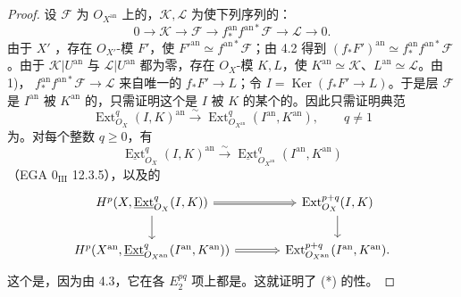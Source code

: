 \begin{proof}
设 $\mathcal F$ 为 $O_{X^{\mathrm{an}}}$ 上的，$\mathcal K,\mathcal L$ 为使下列序列的：
\[
0\longrightarrow\mathcal K\longrightarrow\mathcal F
\longrightarrow f_*^{\mathrm{an}}f^{\mathrm{an}*}\mathcal F
\longrightarrow\mathcal L\longrightarrow0.
\]
由于 $X'$ ，存在 $O_{X'}$-模 $F'$，使 $F'^{\mathrm{an}}\simeq f^{\mathrm{an}*}\mathcal F$；由 4.2 得到 $(f_*F')^{\mathrm{an}}\simeq f_*^{\mathrm{an}}f^{\mathrm{an}*}\mathcal F$。由于 $\mathcal K|U^{\mathrm{an}}$ 与 $\mathcal L|U^{\mathrm{an}}$ 都为零，存在 $O_X$-模 $K,L$，使 $K^{\mathrm{an}}\simeq\mathcal K$、$L^{\mathrm{an}}\simeq\mathcal L$。由 1)， $f_*^{\mathrm{an}}f^{\mathrm{an}*}\mathcal F\to\mathcal L$ 来自唯一的 $f_*F'\to L$；令 $I=\operatorname{Ker}(f_*F'\to L)$。于是层 $\mathcal F$ 是 $I^{\mathrm{an}}$ 被 $K^{\mathrm{an}}$ 的，只需证明这个是 $I$ 被 $K$ 的某个的。因此只需证明典范
\[
\operatorname{Ext}_{O_X}^q(I,K)^{\mathrm{an}}\xrightarrow{\sim}
\operatorname{Ext}_{O_{X^{\mathrm{an}}}}^q(I^{\mathrm{an}},K^{\mathrm{an}}),\qquad q\ne1
\tag{*}
\]
为。对每个整数 $q\geq0$，有
\[
\underline{\operatorname{Ext}}_{O_X}^q(I,K)^{\mathrm{an}}\xrightarrow{\sim}
\underline{\operatorname{Ext}}_{O_{X^{\mathrm{an}}}}^q(I^{\mathrm{an}},K^{\mathrm{an}})
\]
（EGA $0_{\mathrm{III}}$ 12.3.5），以及的
\[
\begin{tikzcd}[column sep=large]
H^p(X,\underline{\operatorname{Ext}}_{O_X}^q(I,K))\arrow[r,Rightarrow]\arrow[d]&
\operatorname{Ext}_{O_X}^{p+q}(I,K)\arrow[d]\\
H^p(X^{\mathrm{an}},\underline{\operatorname{Ext}}_{O_{X^{\mathrm{an}}}}^q(I^{\mathrm{an}},K^{\mathrm{an}}))\arrow[r,Rightarrow]&
\operatorname{Ext}_{O_{X^{\mathrm{an}}}}^{p+q}(I^{\mathrm{an}},K^{\mathrm{an}}).
\end{tikzcd}
\]
这个是，因为由 4.3，它在各 $E_2^{pq}$ 项上都是。这就证明了 (*) 的性。
\end{proof}


